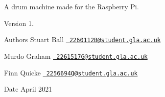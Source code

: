 A drum machine made for the Raspberry Pi. \begin{DoxyVersion}{Version}
1. 
\end{DoxyVersion}
\begin{DoxyAuthor}{Authors}
Stuart Ball \href{mailto:2260112B@student.gla.ac.uk}{\texttt{ 2260112\+B@student.\+gla.\+ac.\+uk}} 

Murdo Graham \href{mailto:2261517G@student.gla.ac.uk}{\texttt{ 2261517\+G@student.\+gla.\+ac.\+uk}} 

Finn Quicke \href{mailto:2256694Q@student.gla.ac.uk}{\texttt{ 2256694\+Q@student.\+gla.\+ac.\+uk}} 
\end{DoxyAuthor}
\begin{DoxyDate}{Date}
April 2021 
\end{DoxyDate}
